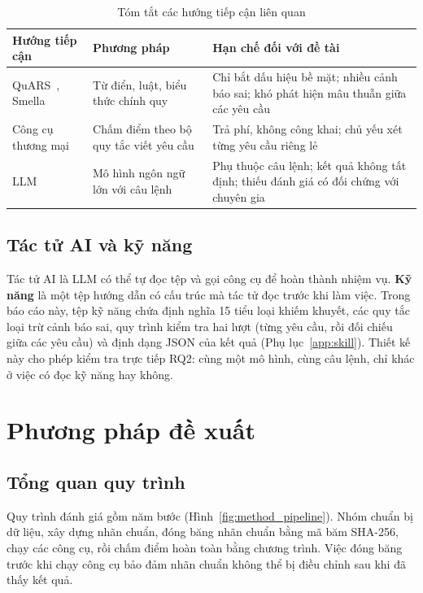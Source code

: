 \documentclass[12pt,a4paper]{report}
\begin{document}
\begin{table}[H]
\centering
\caption{Tóm tắt các hướng tiếp cận liên quan}
\label{tab:related}
\small
\begin{tabular}{p{3.4cm}p{4.6cm}p{6.4cm}}
\toprule
\textbf{Hướng tiếp cận} & \textbf{Phương pháp} & \textbf{Hạn chế đối với đề tài} \\
\midrule
QuARS~\cite{fabbrini2005}, Smella~\cite{femmer2017} & Từ điển, luật, biểu thức chính quy & Chỉ bắt dấu hiệu bề mặt; nhiều cảnh báo sai; khó phát hiện mâu thuẫn giữa các yêu cầu \\
Công cụ thương mại & Chấm điểm theo bộ quy tắc viết yêu cầu & Trả phí, không công khai; chủ yếu xét từng yêu cầu riêng lẻ \\
LLM~\cite{lubos2024,ronanki2025} & Mô hình ngôn ngữ lớn với câu lệnh & Phụ thuộc câu lệnh; kết quả không tất định; thiếu đánh giá có đối chứng với chuyên gia \\
\bottomrule
\end{tabular}
\end{table}

\section{Tác tử AI và kỹ năng}
Tác tử AI là LLM có thể tự đọc tệp và gọi công cụ để hoàn thành nhiệm vụ. \textbf{Kỹ năng} là một tệp hướng dẫn có cấu trúc mà tác tử đọc trước khi làm việc. Trong báo cáo này, tệp kỹ năng chứa định nghĩa 15 tiểu loại khiếm khuyết, các quy tắc loại trừ cảnh báo sai, quy trình kiểm tra hai lượt (từng yêu cầu, rồi đối chiếu giữa các yêu cầu) và định dạng JSON của kết quả (Phụ lục~\ref{app:skill}). Thiết kế này cho phép kiểm tra trực tiếp RQ2: cùng một mô hình, cùng câu lệnh, chỉ khác ở việc có đọc kỹ năng hay không.

\chapter{Phương pháp đề xuất}

\section{Tổng quan quy trình}
Quy trình đánh giá gồm năm bước (Hình~\ref{fig:method_pipeline}). Nhóm chuẩn bị dữ liệu, xây dựng nhãn chuẩn, đóng băng nhãn chuẩn bằng mã băm SHA-256, chạy các công cụ, rồi chấm điểm hoàn toàn bằng chương trình. Việc đóng băng trước khi chạy công cụ bảo đảm nhãn chuẩn không thể bị điều chỉnh sau khi đã thấy kết quả.
\end{document}
